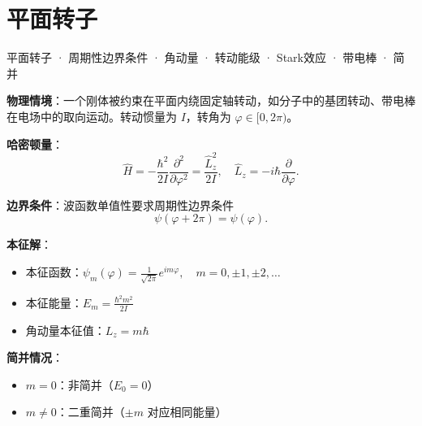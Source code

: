 
\section{平面转子}
\label{sec:planar-rotor}

\begin{tipbox}[关键词标签]
平面转子 · 周期性边界条件 · 角动量 · 转动能级 · Stark效应 · 带电棒 · 简并
\end{tipbox}

\begin{modelbox}[模型：一维角坐标上的自由转动]
\textbf{物理情境}：一个刚体被约束在平面内绕固定轴转动，如分子中的基团转动、带电棒在电场中的取向运动。转动惯量为 $I$，转角为 $\varphi\in[0,2\pi)$。

\textbf{哈密顿量}：
\[
\hat H=-\frac{\hbar^2}{2I}\frac{\partial^2}{\partial\varphi^2}=\frac{\hat L_z^2}{2I},
\quad\hat L_z=-i\hbar\frac{\partial}{\partial\varphi}.
\]

\textbf{边界条件}：波函数单值性要求周期性边界条件
\[
\psi(\varphi+2\pi)=\psi(\varphi).
\]

\textbf{本征解}：
\begin{itemize}[nosep]
    \item 本征函数：$\displaystyle\psi_m(\varphi)=\frac{1}{\sqrt{2\pi}}e^{im\varphi},\quad m=0,\pm1,\pm2,\ldots$
    \item 本征能量：$\displaystyle E_m=\frac{\hbar^2m^2}{2I}$
    \item 角动量本征值：$L_z=m\hbar$
\end{itemize}

\textbf{简并情况}：
\begin{itemize}[nosep]
    \item $m=0$：非简并（$E_0=0$）
    \item $m\neq0$：二重简并（$\pm m$ 对应相同能量）
\end{itemize}
\end{modelbox}

